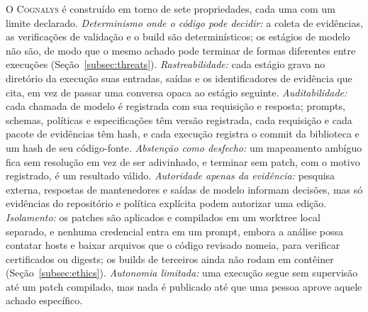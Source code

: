 \documentclass[conference]{IEEEtran}
\newcommand{\system}{\textsc{Cognalys}}
\begin{document}
O \system{} é construído em torno de sete propriedades, cada uma com um limite
declarado. \emph{Determinismo onde o código pode decidir:} a coleta de
evidências, as verificações de validação e o build são determinísticos; os
estágios de modelo não são, de modo que o mesmo achado pode terminar de formas
diferentes entre execuções (Seção~\ref{subsec:threats}).
\emph{Rastreabilidade:} cada estágio grava no diretório da execução suas
entradas, saídas e os identificadores de evidência que cita, em vez de passar
uma conversa opaca ao estágio seguinte.
\emph{Auditabilidade:} cada chamada de modelo é registrada com sua requisição
e resposta; prompts, schemas, políticas e especificações têm versão
registrada, cada requisição e cada pacote de evidências têm hash, e cada
execução registra o commit da biblioteca e um hash de seu código-fonte.
\emph{Abstenção como desfecho:} um mapeamento ambíguo fica sem resolução em vez
de ser adivinhado, e terminar sem patch, com o motivo registrado, é um
resultado válido. \emph{Autoridade apenas da evidência:} pesquisa externa,
respostas de mantenedores e saídas de modelo informam decisões, mas só
evidências do repositório e política explícita podem autorizar uma edição.
\emph{Isolamento:} os patches são aplicados e compilados em um worktree local
separado, e nenhuma credencial entra
em um prompt, embora a análise possa contatar hosts e baixar arquivos que o
código revisado nomeia, para verificar certificados ou digests; os builds de
terceiros ainda não rodam em contêiner (Seção~\ref{subsec:ethics}).
\emph{Autonomia limitada:} uma execução segue sem supervisão até um patch
compilado, mas nada é publicado até que uma pessoa aprove aquele achado
específico.
\end{document}
